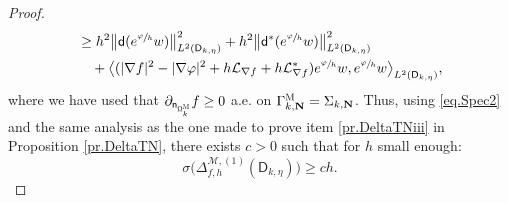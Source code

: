 \documentclass[10pt]{amsart}
\newcommand{\mbf}[1]{\mathbf{#1}}
\theoremstyle{plain}
\theoremstyle{definition}
\begin{document}
\begin{proof}
\begin{equation}
\begin{aligned}
&\ge
h^{2}\big \| \mathsf d (e^{\sfrac{\varphi}{h}} w)\big \|^{2}_{ L^{2} (\mathsf D_{k,\eta})}+
h^{2} \big \| \mathsf d^{*} (e^{\sfrac{\varphi}{h}} w) \big \|^{2}_{ L^{2} (\mathsf D_{k,\eta})}\\
&\quad + \big \langle
(|\nabla f|^{2}-|\nabla \varphi|^{2}+h\mathcal{L}_{\nabla
f}+h\mathcal{L}_{\nabla
f}^{*})e^{\sfrac{\varphi}{h}} w, e^{\sfrac{\varphi}{h}}
w\big \rangle_{ L^{2} (\mathsf D_{k,\eta})},
\end{aligned}
\end{equation}
where we have used that $\partial_{\mathsf n_{ \mathsf \Omega_k^{\textsc{M}} } }f\ge 0$ a.e. on $\Gamma_{k,\mbf N}^{\textsc{M}}=\Sigma_{k,\mbf N}$.
Thus, using \eqref{eq.Spec2} and the same analysis as the one made to prove item \eqref{pr.DeltaTNiii} in Proposition \ref{pr.DeltaTN}, there exists $c>0$ such that for $h$ small enough:
\begin{equation}\label{eq.Spec1}
\sigma \bigl(\Delta_{f,h}^{ \mathcal M,(1)} (\mathsf D_{k,\eta})\bigr)\ge ch.
\end{equation}


\end{proof}
\end{document}
